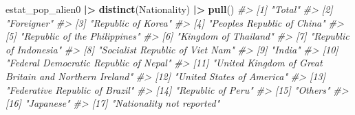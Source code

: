 \documentclass[
  xelatex, ja=standard]{bxjsbook}
\newenvironment{Shaded}{\begin{snugshade}}{\end{snugshade}}
\newcommand{\CommentTok}[1]{\textcolor[rgb]{0.56,0.35,0.01}{\textit{#1}}}
\newcommand{\FunctionTok}[1]{\textcolor[rgb]{0.13,0.29,0.53}{\textbf{#1}}}
\newcommand{\NormalTok}[1]{#1}
\newcommand{\SpecialCharTok}[1]{\textcolor[rgb]{0.81,0.36,0.00}{\textbf{#1}}}
\theoremstyle{definition}
\theoremstyle{definition}
\theoremstyle{definition}
\theoremstyle{definition}
\theoremstyle{remark}
\begin{document}
\begin{Shaded}
\begin{Highlighting}[]
\NormalTok{estat\_pop\_alien0 }\SpecialCharTok{|\textgreater{}} \FunctionTok{distinct}\NormalTok{(Nationality) }\SpecialCharTok{|\textgreater{}} \FunctionTok{pull}\NormalTok{()}
\CommentTok{\#\textgreater{}  [1] "Total"                                               }
\CommentTok{\#\textgreater{}  [2] "Foreigner"                                           }
\CommentTok{\#\textgreater{}  [3] "Republic of Korea"                                   }
\CommentTok{\#\textgreater{}  [4] "People\textquotesingle{}s Republic of China"                          }
\CommentTok{\#\textgreater{}  [5] "Republic of the Philippines"                         }
\CommentTok{\#\textgreater{}  [6] "Kingdom of Thailand"                                 }
\CommentTok{\#\textgreater{}  [7] "Republic of Indonesia"                               }
\CommentTok{\#\textgreater{}  [8] "Socialist Republic of Viet Nam"                      }
\CommentTok{\#\textgreater{}  [9] "India"                                               }
\CommentTok{\#\textgreater{} [10] "Federal Democratic Republic of Nepal"                }
\CommentTok{\#\textgreater{} [11] "United Kingdom of Great Britain and Northern Ireland"}
\CommentTok{\#\textgreater{} [12] "United States of America"                            }
\CommentTok{\#\textgreater{} [13] "Federative Republic of Brazil"                       }
\CommentTok{\#\textgreater{} [14] "Republic of Peru"                                    }
\CommentTok{\#\textgreater{} [15] "Others"                                              }
\CommentTok{\#\textgreater{} [16] "Japanese"                                            }
\CommentTok{\#\textgreater{} [17] "Nationality not reported"}
\end{Highlighting}
\end{Shaded}
\end{document}
